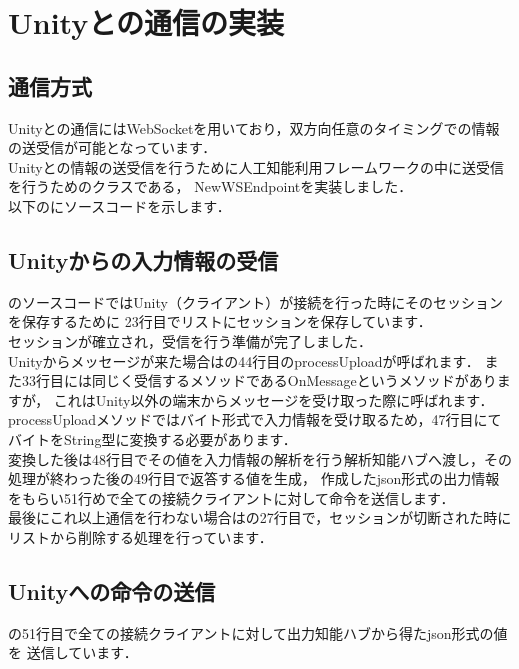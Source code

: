 \section{Unityとの通信の実装}
\subsection{通信方式}
Unityとの通信にはWebSocketを用いており，双方向任意のタイミングでの情報の送受信が可能となっています．\\
Unityとの情報の送受信を行うために人工知能利用フレームワークの中に送受信を行うためのクラスである，
NewWSEndpointを実装しました．\\

以下のにソースコードを示します．\\





\subsection{Unityからの入力情報の受信}
のソースコードではUnity（クライアント）が接続を行った時にそのセッションを保存するために
23行目でリストにセッションを保存しています．\\

セッションが確立され，受信を行う準備が完了しました．\\

Unityからメッセージが来た場合はの44行目のprocessUploadが呼ばれます．
また33行目には同じく受信するメソッドであるOnMessageというメソッドがありますが，
これはUnity以外の端末からメッセージを受け取った際に呼ばれます．\\

processUploadメソッドではバイト形式で入力情報を受け取るため，47行目にてバイトをString型に変換する必要があります．\\
変換した後は48行目でその値を入力情報の解析を行う解析知能ハブへ渡し，その処理が終わった後の49行目で返答する値を生成，
作成したjson形式の出力情報をもらい51行めで全ての接続クライアントに対して命令を送信します．\\



最後にこれ以上通信を行わない場合はの27行目で，セッションが切断された時に
リストから削除する処理を行っています．\\


\subsection{Unityへの命令の送信}
の51行目で全ての接続クライアントに対して出力知能ハブから得たjson形式の値を
送信しています．\\

